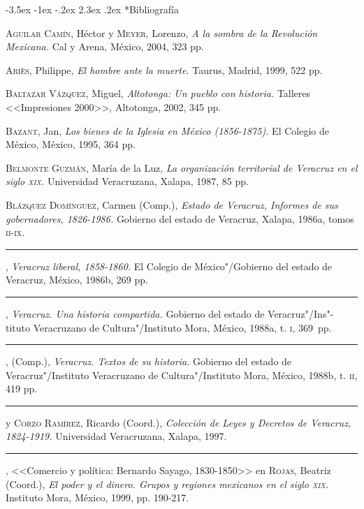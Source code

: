 \documentclass[14pt,twoside,final]{extbook} %
\makeatletter
\renewcommand\section{\@startsection {section}{1}{\z@}%
                                     {-3.5ex \@plus -1ex \@minus -.2ex}%
                                     {2.3ex \@plus .2ex}%
                                     {\normalfont\large\bfseries\sc}}
\makeatother
\begin{document}
\section*{Bibliografía}\label{sec:bibliografia}
\textsc{Aguilar Camín}, Héctor y \textsc{Meyer}, Lorenzo, \emph{A la sombra de la Revolución Mexicana.} Cal y Arena, México, 2004, 323 pp.

\textsc{Ariès}, Philippe, \emph{El hombre ante la muerte.} Taurus, Madrid, 1999, 522 pp.

\textsc{Baltazar Vázquez}, Miguel, \emph{Altotonga: Un pueblo con historia.} Talleres <<Impresiones 2000>>, Altotonga, 2002, 345 pp.

\textsc{Bazant}, Jan, \emph{Los bienes de la Iglesia en México (1856-1875).} El Colegio de México, México, 1995, 364 pp.

\textsc{Belmonte Guzmán}, María de la Luz, \emph{La organización territorial de Veracruz en el siglo \textsc{xix}.} Universidad Veracruzana, Xalapa, 1987, 85 pp.

\textsc{Blázquez Domínguez}, Carmen (Comp.), \emph{Estado de Veracruz, Informes de sus gobernadores, 1826-1986.} Gobierno del estado de Veracruz, Xalapa, 1986a, tomos \textsc{ii-ix}.

\rule{1cm}{0.4pt}, \emph{Veracruz liberal, 1858-1860.} El Colegio de México"/Gobierno del estado de Veracruz, México, 1986b, 269 pp.

\rule{1cm}{0.4pt}, \emph{Veracruz. Una historia compartida.} Gobierno del estado de Veracruz"/Ins"-tituto Veracruzano de Cultura"/Instituto Mora, México, 1988a, t. \textsc{i}, 369~pp.

\rule{1cm}{0.4pt}, (Comp.), \emph{Veracruz. Textos de su historia.} Gobierno del estado de Veracruz"/Instituto Veracruzano de Cultura"/Instituto Mora, México, 1988b, t. \textsc{ii}, 419 pp.

\rule{1cm}{0.4pt} y \textsc{Corzo Ramírez}, Ricardo (Coord.), \emph{Colección de Leyes y Decretos de Veracruz, 1824-1919.} Universidad Veracruzana, Xalapa, 1997.

\rule{1cm}{0.4pt}, <<Comercio y política: Bernardo Sayago, 1830-1850>> en \textsc{Rojas}, Beatriz (Coord.), \emph{El poder y el dinero. Grupos y regiones mexicanos en el siglo \textsc{xix}.} Instituto Mora, México, 1999, pp. 190-217.
\end{document}
